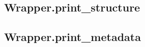 \subsection{Wrapper.print\_structure} \label{subsec:wrapper.print_structure}
    

\subsection{Wrapper.print\_metadata} \label{subsec:wrapper.print_metadata}
    


